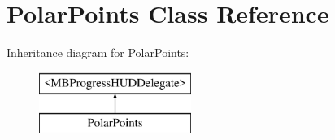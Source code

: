 \hypertarget{interface_polar_points}{
\section{PolarPoints Class Reference}
\label{interface_polar_points}
}
Inheritance diagram for PolarPoints:\begin{figure}[H]
\begin{center}
\leavevmode
\includegraphics[height=2.000000cm]{interface_polar_points}
\end{center}
\end{figure}
